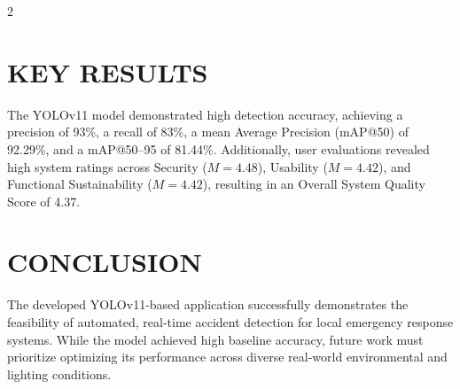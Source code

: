 \documentclass[12pt,a4paper]{article}
\begin{document}
\begin{multicols}{2}
\vspace{1em} 

\section*{KEY RESULTS}
The YOLOv11 model demonstrated high detection accuracy, achieving a precision of 93\%, a recall of 83\%, a mean Average Precision (mAP@50) of 92.29\%, and a mAP@50--95 of 81.44\%. Additionally, user evaluations revealed high system ratings across Security ($M=4.48$), Usability ($M=4.42$), and Functional Sustainability ($M=4.42$), resulting in an Overall System Quality Score of 4.37.

\vspace{1em} 

\section*{CONCLUSION}
The developed YOLOv11-based application successfully demonstrates the feasibility of automated, real-time accident detection for local emergency response systems. While the model achieved high baseline accuracy, future work must prioritize optimizing its performance across diverse real-world environmental and lighting conditions.

\end{multicols}
\end{document}
